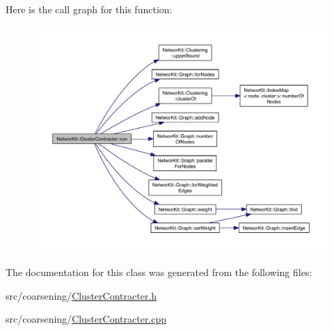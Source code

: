 Here is the call graph for this function\-:\nopagebreak
\begin{figure}[H]
\begin{center}
\leavevmode
\includegraphics[width=350pt]{class_networ_kit_1_1_cluster_contracter_a9e0d1a9207829df868b163b95cba85ca_cgraph}
\end{center}
\end{figure}




The documentation for this class was generated from the following files\-:\begin{DoxyCompactItemize}
\item 
src/coarsening/\hyperlink{_cluster_contracter_8h}{Cluster\-Contracter.\-h}\item 
src/coarsening/\hyperlink{_cluster_contracter_8cpp}{Cluster\-Contracter.\-cpp}\end{DoxyCompactItemize}

